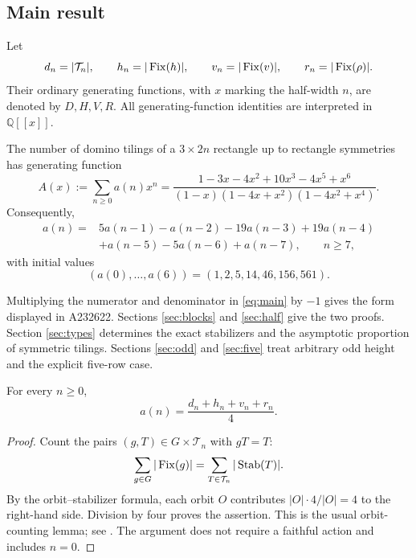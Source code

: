 \subsection{Main result}
Let
\[
 d_n=|\mathcal T_n|,\qquad h_n=|\operatorname{Fix}(h)|,\qquad
 v_n=|\operatorname{Fix}(v)|,\qquad r_n=|\operatorname{Fix}(\rho)|.
\]
Their ordinary generating functions, with $x$ marking the
half-width $n$, are denoted by $D,H,V,R$.
All generating-function identities are interpreted in
$\mathbb Q[[x]]$.

\begin{theorem}\label{thm:main}
The number of domino tilings of a $3\times2n$ rectangle up to
rectangle symmetries has generating function
\begin{equation}\label{eq:main}
 A(x):=\sum_{n\ge0}a(n)x^n
 =\frac{1-3x-4x^2+10x^3-4x^5+x^6}
 {(1-x)(1-4x+x^2)(1-4x^2+x^4)}.
\end{equation}
Consequently,
\begin{equation}\label{eq:recurrence}
\begin{split}
a(n)={}&5a(n-1)-a(n-2)-19a(n-3)+19a(n-4)\\
       &+a(n-5)-5a(n-6)+a(n-7),\qquad n\ge7,
\end{split}
\end{equation}
with initial values
\[
 (a(0),\ldots,a(6))=(1,2,5,14,46,156,561).
\]
\end{theorem}

Multiplying the numerator and denominator in \eqref{eq:main} by
$-1$ gives the form displayed in A232622.
Sections \ref{sec:blocks} and \ref{sec:half} give the two proofs.
Section \ref{sec:types} determines the exact stabilizers and the
asymptotic proportion of symmetric tilings.
Sections \ref{sec:odd} and \ref{sec:five} treat arbitrary odd height
and the explicit five-row case.

\begin{lemma}\label{lem:burnside}
For every $n\ge0$,
\begin{equation}\label{eq:burnside}
 a(n)=\frac{d_n+h_n+v_n+r_n}{4}.
\end{equation}
\end{lemma}
\begin{proof}
Count the pairs $(g,T)\in G\times\mathcal T_n$ with $gT=T$:
\[
 \sum_{g\in G}|\operatorname{Fix}(g)|
 =\sum_{T\in\mathcal T_n}|\operatorname{Stab}(T)|.
\]
By the orbit--stabilizer formula, each orbit $O$ contributes
$|O|\cdot4/|O|=4$ to the right-hand side.
Division by four proves the assertion.
This is the usual orbit-counting lemma; see
\cite[Chapter 7, Lemma 7.2]{stanley}.
The argument does not require a faithful action and includes $n=0$.
\end{proof}
